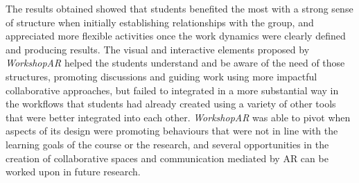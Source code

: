 The results obtained showed that students benefited the most with a strong sense of structure when initially establishing relationships with the group, and appreciated more flexible
activities once the work dynamics were clearly defined and producing results. The visual and interactive elements proposed by \emph{WorkshopAR} helped the students understand and be aware
of the need of those structures, promoting discussions and guiding work using more impactful collaborative approaches, but failed to integrated in a more substantial way in the workflows
that students had already created using a variety of other tools that were better integrated into each other. \emph{WorkshopAR} was able to pivot when aspects of its design were promoting
behaviours that were not in line with the learning goals of the course or the research, and several opportunities in the creation of collaborative spaces and communication mediated by \ac{AR}
can be worked upon in future research.